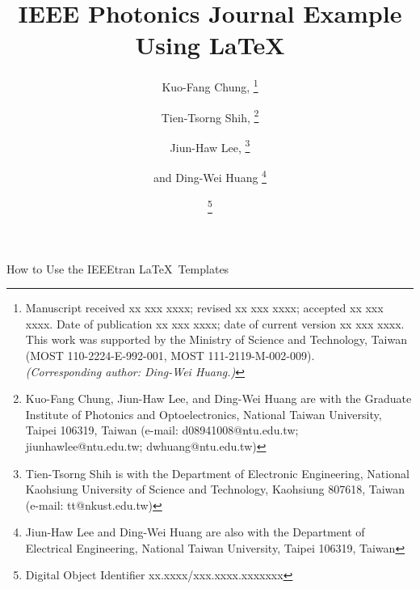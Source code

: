 \documentclass[lettersize,journal]{IEEEtran}
\def\ur#1{{\color{ured}#1}}
\begin{document}


\title{\ur{IEEE Photonics Journal Example Using LaTeX}}

\author{
Kuo-Fang Chung, 
\thanks{Manuscript received xx xxx xxxx; revised xx xxx xxxx; accepted xx xxx xxxx. Date of publication xx xxx xxxx; 
date of current version xx xxx xxxx. This work was supported by the Ministry of Science and Technology, 
Taiwan (MOST 110-2224-E-992-001, MOST 111-2119-M-002-009). \\\textit{(Corresponding author: Ding-Wei Huang.)}} \and 
Tien-Tsorng Shih, 
\thanks{Kuo-Fang Chung\ur{, Jiun-Haw Lee}, and Ding-Wei Huang are with \ur{the} 
Graduate Institute of Photonics and Optoelectronics, National Taiwan University, Taipei 106319, Taiwan 
(e-mail: d08941008@ntu.edu.tw; jiunhawlee@ntu.edu.tw; dwhuang@ntu.edu.tw)} \and 
Jiun-Haw Lee, 
\thanks{Tien-Tsorng Shih is with \ur{the} 
Department of Electronic Engineering, National Kaohsiung University of Science and Technology, Kaohsiung 807618, Taiwan 
(e-mail: tt@nkust.edu.tw)} \and 
and Ding-Wei Huang
\thanks{\ur{Jiun-Haw Lee and Ding-Wei Huang are} also with \ur{the} 
Department of Electrical Engineering, National Taiwan University, Taipei 106319, Taiwan} \and 
\thanks{Digital Object Identifier xx.xxxx/xxx.xxxx.xxxxxxx}
}


%
{How to Use the IEEEtran \LaTeX \ Templates}

\maketitle
\end{document}
